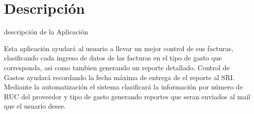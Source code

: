 \documentclass[utf8]{beamer}
\begin{document}
\section{Descripción}

\begin{frame}[allowframebreaks]


\begin{block}{descripción de la Aplicación}

Esta aplicación ayudará al usuario a llevar un mejor control de sus facturas, clasificando cada ingreso de datos de las facturas en el tipo de gasto que corresponda, asi como tambien generando un reporte detallado. 
Control de Gastos ayudará  recordando la fecha máxima de entrega de el reporte al SRI. 
Mediante la automatización el sistema clasificará la información por número de RUC del proveedor y tipo de gasto generando reportes que seran enviados al mail que el usuario desee.
\end {block}

\end{frame}
\end{document}
